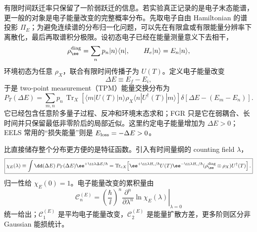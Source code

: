 有限时间跃迁率只保留了一阶弱跃迁的信息。若实验真正记录的是电子末态能谱，更一般的对象是电子能量改变的完整概率分布。先取电子自由 Hamiltonian 的谱投影 $\Pi_E$；为避免连续谱的分布归一化问题，可以先在有限盒或有限能量分辨率下离散化，最后再取谱积分极限。设初态电子已经在能量测量意义下去相干，
\[
\rho_\ee^{\rm diag}=\sum_n p_n|n\rangle\langle n|,
\qquad
H_e|n\rangle=E_n|n\rangle,
\]
环境初态为任意 $\rho_X$，联合有限时间传播子为 $U(T)$。定义电子能量改变
\[
\Delta E\equiv E_f-E_i,
\]
于是 two-point measurement（TPM）能量交换分布为
\begin{equation}
\boxed{
P_T(\Delta E)
=\sum_{m,n}p_n\,
\operatorname{Tr}_X\!\left[
\langle m|U(T)|n\rangle\rho_X
\langle n|U^\dagger(T)|m\rangle
\right]
\delta[\Delta E-(E_m-E_n)].}
\label{eq:electron_energy_exchange_tpm_distribution}
\end{equation}
它已经包含任意阶多量子过程、反冲和环境末态求和；FGR 只是它在弱耦合、长时间并只保留最低非零阶后的局部近似。这里约定电子能量增加为 $\Delta E>0$；EELS 常用的“损失能量”则是 $E_{\rm loss}=-\Delta E>0$。

比直接储存整个分布更方便的是特征函数。引入有时间量纲的 counting field $\lambda$，
\begin{equation}
\boxed{
\chi_E(\lambda)
\equiv\int\dd(\Delta E)\,
P_T(\Delta E)\ee^{+\ii\lambda\Delta E/\hbar}
=\operatorname{Tr}_{eX}\!\left[
\ee^{+\ii\lambda H_e/\hbar}
U(T)
\ee^{-\ii\lambda H_e/\hbar}
(\rho_\ee^{\rm diag}\otimes\rho_X)
U^\dagger(T)
\right].}
\label{eq:electron_energy_exchange_characteristic_function}
\end{equation}
归一性给 $\chi_E(0)=1$。电子能量改变的累积量由
\[
\mathcal C_n^{(E)}
=\left(\frac{\hbar}{\ii}\right)^n
\left.\frac{\partial^n}{\partial\lambda^n}
\ln\chi_E(\lambda)\right|_{\lambda=0}
\]
统一给出；$\mathcal C_1^{(E)}$ 是平均电子能量改变，$\mathcal C_2^{(E)}$ 是能量扩散方差，更多阶则区分非 Gaussian 能损统计。

